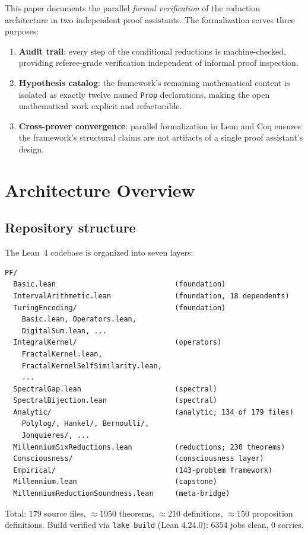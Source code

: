 \documentclass[11pt,a4paper]{article}
\theoremstyle{definition}
\begin{document}
This paper documents the parallel \emph{formal verification} of the
reduction architecture in two independent proof assistants. The
formalization serves three purposes:
\begin{enumerate}
\item \textbf{Audit trail}: every step of the conditional reductions is
machine-checked, providing referee-grade verification independent of
informal proof inspection.
\item \textbf{Hypothesis catalog}: the framework's remaining mathematical
content is isolated as exactly twelve named \texttt{Prop} declarations,
making the open mathematical work explicit and refactorable.
\item \textbf{Cross-prover convergence}: parallel formalization in Lean
and Coq ensures the framework's structural claims are not artifacts of
a single proof assistant's design.
\end{enumerate}

\section{Architecture Overview}

\subsection{Repository structure}

The Lean~4 codebase is organized into seven layers:

\begin{lstlisting}
PF/
  Basic.lean                            (foundation)
  IntervalArithmetic.lean               (foundation, 18 dependents)
  TuringEncoding/                       (foundation)
    Basic.lean, Operators.lean,
    DigitalSum.lean, ...
  IntegralKernel/                       (operators)
    FractalKernel.lean,
    FractalKernelSelfSimilarity.lean,
    ...
  SpectralGap.lean                      (spectral)
  SpectralBijection.lean                (spectral)
  Analytic/                             (analytic; 134 of 179 files)
    Polylog/, Hankel/, Bernoulli/,
    Jonquieres/, ...
  MillenniumSixReductions.lean          (reductions; 230 theorems)
  Consciousness/                        (consciousness layer)
  Empirical/                            (143-problem framework)
  Millennium.lean                       (capstone)
  MillenniumReductionSoundness.lean     (meta-bridge)
\end{lstlisting}

Total: $179$ source files, $\approx 1950$ theorems, $\approx 210$
definitions, $\approx 150$ proposition definitions. Build verified via
\texttt{lake build} (Lean 4.24.0): $6354$ jobs clean, $0$ sorries.
\end{document}
